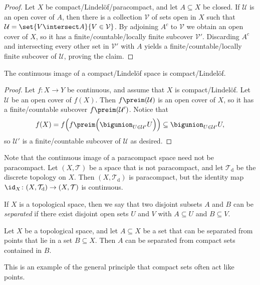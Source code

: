 \documentclass[article, a4paper, 11pt, oneside]{memoir}
\numberwithin{equation}{chapter}
\newcommand{\calU}{\mathcal{U}}
\newcommand{\calV}{\mathcal{V}}
\newcommand{\calT}{\mathcal{T}}
\begin{document}
\begin{proof}
    Let $X$ be compact/Lindelöf/paracompact, and let $A \subseteq X$ be closed. If $\calU$ is an open cover of $A$, then there is a collection $\calV$ of sets open in $X$ such that $\calU = \set{V \intersect A}{V \in \calV}$. By adjoining $A^c$ to $\calV$ we obtain an open cover of $X$, so it has a finite/countable/locally finite subcover $\calV'$. Discarding $A^c$ and intersecting every other set in $\calV'$ with $A$ yields a finite/countable/locally finite subcover of $\calU$, proving the claim.
\end{proof}


\begin{proposition}
    The continuous image of a compact/Lindelöf space is compact/Lindelöf.
\end{proposition}

\begin{proof}
    Let $f \colon X \to Y$ be continuous, and assume that $X$ is compact/Lindelöf. Let $\calU$ be an open cover of $f(X)$. Then $f\preim(\calU)$ is an open cover of $X$, so it has a finite/countable subcover $f\preim(\calU')$. Notice that
    \begin{equation*}
        f(X)
            = f \Bigl( f\preim \Bigl( \bigunion_{U \in \calU'} U \Bigr) \Bigr)
            \subseteq \bigunion_{U \in \calU'} U,
    \end{equation*}
    so $\calU'$ is a finite/countable subcover of $\calU$ as desired.
\end{proof}


\begin{remark}
    Note that the continuous image of a paracompact space need not be paracompact. Let $(X,\calT)$ be a space that is not paracompact, and let $\calT_{\mathrm{d}}$ be the discrete topology on $X$. Then $(X,\calT_{\mathrm{d}})$ is paracompact, but the identity map $\id_X \colon (X,\calT_{\mathrm{d}}) \to (X,\calT)$ is continuous.
\end{remark}


If $X$ is a topological space, then we say that two disjoint subsets $A$ and $B$ can be \emph{separated} if there exist disjoint open sets $U$ and $V$ with $A \subseteq U$ and $B \subseteq V$.

\begin{lemma}
    \label{thm:separating_from_compacts}
    Let $X$ be a topological space, and let $A \subseteq X$ be a set that can be separated from points that lie in a set $B \subseteq X$. Then $A$ can be separated from compact sets contained in $B$.
\end{lemma}
%
This is an example of the general principle that compact sets often act like points.
\end{document}
